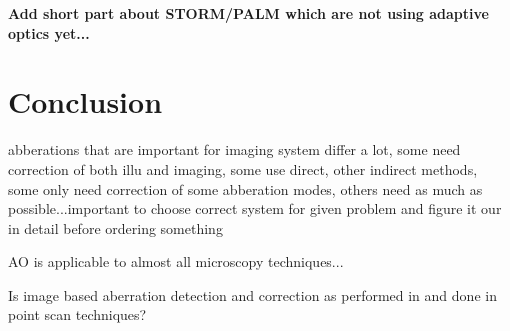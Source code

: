 \textbf{Add short part about STORM/PALM which are not using adaptive optics yet...
} \cite{future_AOM_PALM_1}
\section{Conclusion}
\label{sec:Conclusion}

abberations that are important for imaging system differ a lot, some need 
correction of both illu and imaging, some use direct, other indirect methods, 
some only need correction of some abberation modes, others need as much as 
possible...important to choose correct system for given problem and figure it 
our in detail before ordering something

AO is applicable to almost all microscopy techniques...

Is image based aberration detection and correction as performed in \cite{wide_AOM_loew_freq} and \cite{wide_AOM_structured_illu} done in point scan techniques?


\clearpage